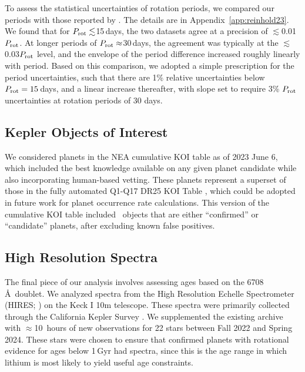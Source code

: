 \documentclass[11pt,twocolumn,tighten]{aastex63}
\begin{document}
To assess the statistical uncertainties of  rotation periods, we
compared our  periods with those reported by
\citet{McQuillan_2014}.  The details are in
Appendix~\ref{app:reinhold23}.  We found that for $P_{\rm
rot}\lesssim$15\,days, the two datasets agree at a precision of
$\lesssim$0.01$P_{\rm rot}$.  At longer periods of $P_{\rm
rot}\approx$30\,days, the agreement was typically at the
$\lesssim$0.03$P_{\rm rot}$ level, and the envelope of the period
difference increased roughly linearly with period.  Based on this
comparison, we adopted a simple prescription for the period
uncertainties, such that there are 1\% relative uncertainties below
$P_{\rm rot}=15$\,days, and a linear increase thereafter, with slope
set to require 3\% $P_{\rm rot}$ uncertainties at rotation periods of
30 days.







\subsection{Kepler Objects of Interest}
\label{subsec:planetsel}

We considered planets in the NEA cumulative KOI table as of 2023 June
6, which included the best knowledge available on any given planet
candidate while also incorporating human-based vetting.  These planets
represent a superset of those in the fully automated Q1-Q17 DR25 KOI
Table \citep{Thompson_2018}, which could be adopted in future work for
planet occurrence rate calculations.  This version of the cumulative
KOI table included \nkoisnofp\ objects that are either ``confirmed''
or ``candidate'' planets, after excluding known false positives. 

\subsection{High Resolution Spectra}
\label{subsec:lithiumsel}

The final piece of our analysis involves assessing ages based on the
 6708\,\AA\ doublet.  We analyzed spectra from the High
Resolution Echelle Spectrometer (HIRES; \citealt{vogt_hires_1994}) on
the Keck I 10m telescope.  These spectra were primarily collected
through the California Kepler Survey
\citep{2017AJ....154..107P,2017AJ....154..108J,2017AJ....154..109F}.
We supplemented the existing archive with $\approx$10~hours of new
observations for 22 stars between Fall 2022 and Spring 2024.  These
stars were chosen to ensure that confirmed planets with rotational
evidence for ages below 1\,Gyr had spectra, since this is the age
range in which lithium is most likely to yield useful age constraints.
\end{document}
